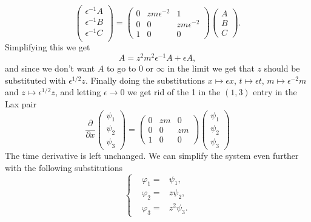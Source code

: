\documentclass[english,master]{liumaiex}
\theoremstyle{plain}
\theoremstyle{definition}
\begin{document}
\begin{equation}
\begin{pmatrix} 
	\epsilon^{-1} A \\
	\epsilon^{-1} B \\
	\epsilon^{-1} C \\
\end{pmatrix} =
\begin{pmatrix}
	0 & zm\epsilon^{-2} & 1 \\
	0 & 0 & zm\epsilon^{-2}  \\
	1 & 0 & 0
\end{pmatrix}
\begin{pmatrix} A \\ B \\ C \end{pmatrix} .
\end{equation}
Simplifying this we get
\begin{equation}
	A = z^2m^2\epsilon^{-1}A + \epsilon A,
\end{equation}
and since we don't want $A$ to go to $0$ or $\infty$ in the limit we get that $z$ should be substituted with $\epsilon^{1/2}z$.
Finally doing the substitutions $x \mapsto \epsilon x$, $t \mapsto \epsilon t$, $m \mapsto \epsilon^{-2} m$ and $z \mapsto \epsilon^{1/2}z$, and letting $\epsilon \rightarrow 0$ we get rid of the 1 in the $(1,3)$ entry in the Lax pair
\begin{equation}
\frac{\partial}{\partial x}
\begin{pmatrix} \psi_1 \\ \psi_2 \\ \psi_3 \end{pmatrix} =
\begin{pmatrix}
	0 & zm & 0 \\
	0 & 0 & zm \\
	1 & 0 & 0
\end{pmatrix}
\begin{pmatrix} \psi_1 \\ \psi_2 \\ \psi_3 \end{pmatrix}
\end{equation}
The time derivative is left unchanged. We can simplify the system even further with the following substitutions
\begin{equation}
\left\{ \begin{aligned}
	&\varphi_1 = &\psi_1, \\
	&\varphi_2 = &z\psi_2, \\
	&\varphi_3 = &z^2\psi_3.
\end{aligned} \right.
\end{equation}
\end{document}
